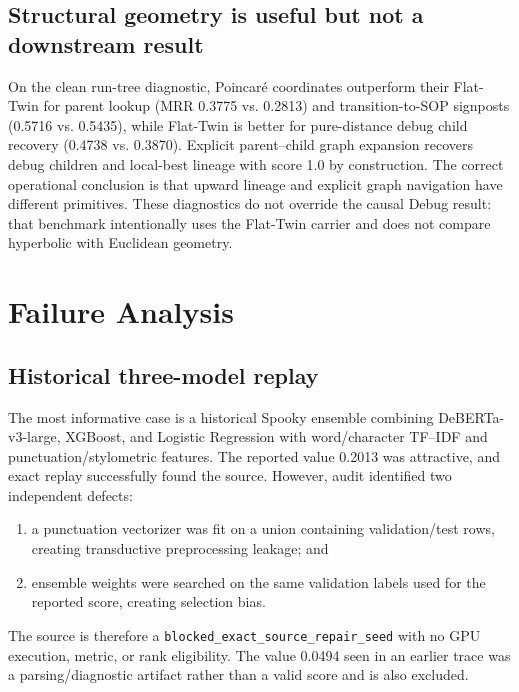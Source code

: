 \documentclass{article}
\begin{document}


\subsection{Structural geometry is useful but not a downstream result}

On the clean run-tree diagnostic, Poincar\'e coordinates outperform their
Flat-Twin for parent lookup (MRR 0.3775 vs. 0.2813) and transition-to-SOP
signposts (0.5716 vs. 0.5435), while Flat-Twin is better for pure-distance debug
child recovery (0.4738 vs. 0.3870).  Explicit parent--child graph expansion
recovers debug children and local-best lineage with score 1.0 by construction.
The correct operational conclusion is that upward lineage and explicit graph
navigation have different primitives.  These diagnostics do not override the
causal Debug result: that benchmark intentionally uses the Flat-Twin carrier and
does not compare hyperbolic with Euclidean geometry.

\FloatBarrier
\section{Failure Analysis}
\label{sec:failure}

\subsection{Historical three-model replay}

The most informative case is a historical Spooky ensemble combining
DeBERTa-v3-large, XGBoost, and Logistic Regression with word/character TF--IDF
and punctuation/stylometric features.  The reported value 0.2013 was attractive,
and exact replay successfully found the source.  However, audit identified two
independent defects:

\begin{enumerate}[leftmargin=*,itemsep=1pt]
  \item a punctuation vectorizer was fit on a union containing validation/test
  rows, creating transductive preprocessing leakage; and
  \item ensemble weights were searched on the same validation labels used for
  the reported score, creating selection bias.
\end{enumerate}

The source is therefore a \texttt{blocked\_exact\_source\_repair\_seed} with no
GPU execution, metric, or rank eligibility.  The value 0.0494 seen in an earlier
trace was a parsing/diagnostic artifact rather than a valid score and is also
excluded.
\end{document}
